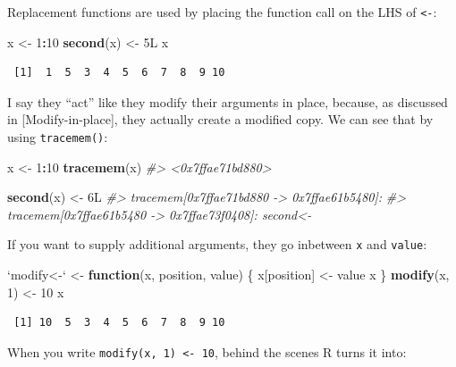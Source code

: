 \documentclass[]{book}
\newenvironment{Shaded}{\begin{snugshade}}{\end{snugshade}}
\newcommand{\CommentTok}[1]{\textcolor[rgb]{0.56,0.35,0.01}{\textit{#1}}}
\newcommand{\ControlFlowTok}[1]{\textcolor[rgb]{0.13,0.29,0.53}{\textbf{#1}}}
\newcommand{\DataTypeTok}[1]{\textcolor[rgb]{0.13,0.29,0.53}{#1}}
\newcommand{\DecValTok}[1]{\textcolor[rgb]{0.00,0.00,0.81}{#1}}
\newcommand{\KeywordTok}[1]{\textcolor[rgb]{0.13,0.29,0.53}{\textbf{#1}}}
\newcommand{\NormalTok}[1]{#1}
\newcommand{\OperatorTok}[1]{\textcolor[rgb]{0.81,0.36,0.00}{\textbf{#1}}}
\newcommand{\StringTok}[1]{\textcolor[rgb]{0.31,0.60,0.02}{#1}}
\theoremstyle{definition}
\theoremstyle{definition}
\theoremstyle{definition}
\theoremstyle{remark}
\begin{document}
Replacement functions are used by placing the function call on the LHS
of \texttt{\textless{}-}:

\begin{Shaded}
\begin{Highlighting}[]
\NormalTok{x <-}\StringTok{ }\DecValTok{1}\OperatorTok{:}\DecValTok{10}
\KeywordTok{second}\NormalTok{(x) <-}\StringTok{ }\NormalTok{5L}
\NormalTok{x}
\end{Highlighting}
\end{Shaded}

\begin{verbatim}
 [1]  1  5  3  4  5  6  7  8  9 10
\end{verbatim}

I say they ``act'' like they modify their arguments in place, because,
as discussed in {[}Modify-in-place{]}, they actually create a modified
copy. We can see that by using \texttt{tracemem()}:

\begin{Shaded}
\begin{Highlighting}[]
\NormalTok{x <-}\StringTok{ }\DecValTok{1}\OperatorTok{:}\DecValTok{10}
\KeywordTok{tracemem}\NormalTok{(x)}
\CommentTok{#> <0x7ffae71bd880>}

\KeywordTok{second}\NormalTok{(x) <-}\StringTok{ }\NormalTok{6L}
\CommentTok{#> tracemem[0x7ffae71bd880 -> 0x7ffae61b5480]: }
\CommentTok{#> tracemem[0x7ffae61b5480 -> 0x7ffae73f0408]: second<- }
\end{Highlighting}
\end{Shaded}

If you want to supply additional arguments, they go inbetween \texttt{x}
and \texttt{value}:

\begin{Shaded}
\begin{Highlighting}[]
\StringTok{`}\DataTypeTok{modify<-}\StringTok{`}\NormalTok{ <-}\StringTok{ }\ControlFlowTok{function}\NormalTok{(x, position, value) \{}
\NormalTok{  x[position] <-}\StringTok{ }\NormalTok{value}
\NormalTok{  x}
\NormalTok{\}}
\KeywordTok{modify}\NormalTok{(x, }\DecValTok{1}\NormalTok{) <-}\StringTok{ }\DecValTok{10}
\NormalTok{x}
\end{Highlighting}
\end{Shaded}

\begin{verbatim}
 [1] 10  5  3  4  5  6  7  8  9 10
\end{verbatim}

When you write \texttt{modify(x,\ 1)\ \textless{}-\ 10}, behind the
scenes R turns it into:
\end{document}
